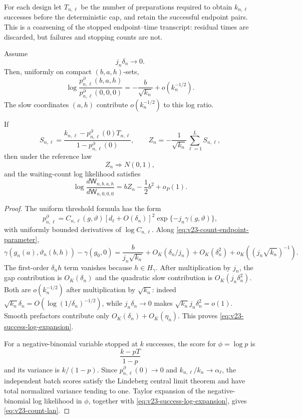 For each design let \(T_{n,\ell}\) be the number of preparations required to
obtain \(k_{n,\ell}\) successes before the deterministic cap, and retain the
successful endpoint pairs.  This is a coarsening of the stopped
endpoint--time transcript: residual times are discarded, but failures and
stopping counts are not.

\begin{lemma}
\label{lem:v23-negative-binomial-score}
Assume
\[
 j_n\delta_n\to0.
\]
Then, uniformly on compact \((b,a,h)\)-sets,
\begin{equation}\label{eq:v23-success-log-expansion}
 \log\frac{p^\partial_{n,\ell}(b,a,h)}
          {p^\partial_{n,\ell}(0,0,0)}
 =-\frac{b}{\sqrt{k_n}}+o(k_n^{-1/2}).
\end{equation}
The slow coordinates \((a,h)\) contribute \(o(k_n^{-1/2})\) to this log
ratio.

If
\[
 S_{n,\ell}
 =\frac{k_{n,\ell}-p^\partial_{n,\ell}(0)T_{n,\ell}}
        {1-p^\partial_{n,\ell}(0)},
 \qquad
 Z_n=-\frac1{\sqrt{k_n}}\sum_{\ell=1}^LS_{n,\ell},
\]
then under the reference law
\[
                         Z_n\Longrightarrow N(0,1),
\]
and the waiting-count log likelihood satisfies
\begin{equation}\label{eq:v23-count-lan}
 \log\frac{d\mathsf W_{n,b,a,h}}
          {d\mathsf W_{n,0,0,0}}
 =bZ_n-\frac12b^2+o_P(1).
\end{equation}
\end{lemma}

\begin{proof}
The uniform threshold formula has the form
\[
 p^\partial_{n,\ell}
 =C_{n,\ell}(g,\vartheta)
   [d_\ell+O(\delta_n)]^2
   \exp\{-j_n\gamma(g,\vartheta)\},
\]
with uniformly bounded derivatives of \(\log C_{n,\ell}\).  Along
\eqref{eq:v23-count-endpoint-parameter},
\[
 \gamma(g_n(a),\vartheta_n(b,h))-\gamma(g_0,0)
 =\frac{b}{j_n\sqrt{k_n}}
   +O_K(\delta_n/j_n)+O_K(\delta_n^2)+o_K((j_n\sqrt{k_n})^{-1}).
\]
The first-order \(\delta_nh\) term vanishes because \(h\in H_\gamma\).
After multiplication by \(j_n\), the gap contribution is \(O_K(\delta_n)\)
and the quadratic slow contribution is \(O_K(j_n\delta_n^2)\).  Both are
\(o(k_n^{-1/2})\) after multiplication by \(\sqrt{k_n}\): indeed
\(\sqrt{k_n}\delta_n=O(\log(1/\delta_n)^{-1/2})\), while
\(j_n\delta_n\to0\) makes
\(\sqrt{k_n}j_n\delta_n^2=o(1)\).  Smooth prefactors contribute only
\(O_K(\delta_n)+O_K(\eta_n)\).  This proves
\eqref{eq:v23-success-log-expansion}.

For a negative-binomial variable stopped at \(k\) successes, the score for
\(\phi=\log p\) is
\[
                         \frac{k-pT}{1-p}
\]
and its variance is \(k/(1-p)\).  Since
\(p^\partial_{n,\ell}(0)\to0\) and
\(k_{n,\ell}/k_n\to\alpha_\ell\), the independent batch scores satisfy the
Lindeberg central limit theorem and have total normalized variance tending to
one.  Taylor expansion of the negative-binomial log likelihood in
\(\phi\), together with \eqref{eq:v23-success-log-expansion}, gives
\eqref{eq:v23-count-lan}.
\end{proof}

